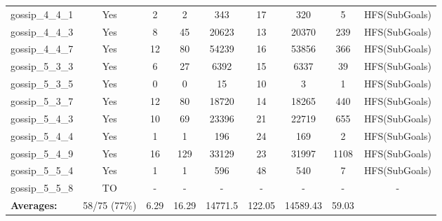 \documentclass{article}
\begin{document}
\begin{tabular}{lcccccccc}
gossip\_4\_4\_1 & Yes & 2 & 2 & 343 & 17 & 320 & 5 & HFS(SubGoals) \\
gossip\_4\_4\_3 & Yes & 8 & 45 & 20623 & 13 & 20370 & 239 & HFS(SubGoals) \\
gossip\_4\_4\_7 & Yes & 12 & 80 & 54239 & 16 & 53856 & 366 & HFS(SubGoals) \\
gossip\_5\_3\_3 & Yes & 6 & 27 & 6392 & 15 & 6337 & 39 & HFS(SubGoals) \\
gossip\_5\_3\_5 & Yes & 0 & 0 & 15 & 10 & 3 & 1 & HFS(SubGoals) \\
gossip\_5\_3\_7 & Yes & 12 & 80 & 18720 & 14 & 18265 & 440 & HFS(SubGoals) \\
gossip\_5\_4\_3 & Yes & 10 & 69 & 23396 & 21 & 22719 & 655 & HFS(SubGoals) \\
gossip\_5\_4\_4 & Yes & 1 & 1 & 196 & 24 & 169 & 2 & HFS(SubGoals) \\
gossip\_5\_4\_9 & Yes & 16 & 129 & 33129 & 23 & 31997 & 1108 & HFS(SubGoals) \\
gossip\_5\_5\_4 & Yes & 1 & 1 & 596 & 48 & 540 & 7 & HFS(SubGoals) \\
gossip\_5\_5\_8 & TO & - & - & - & - & - & - & - \\
\textbf{Averages:} & 58/75 (77\%) & 6.29 & 16.29 & 14771.5 & 122.05 & 14589.43 & 59.03 & \\
\bottomrule
\end{tabular}
\\[0.7cm]
\end{document}
